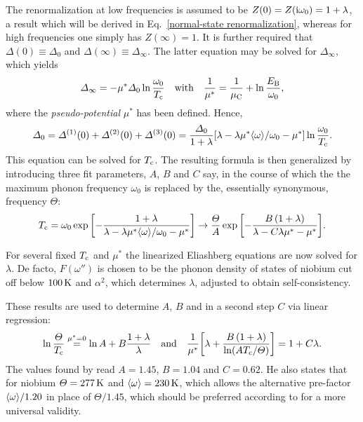 The renormalization at low frequencies is assumed to be $Z(0) = Z(\mathrm i \omega_0) =
1 + \lambda$, a result which will be derived in Eq.~\ref{normal-state
renormalization}, whereas for high frequencies one simply has $Z(\infty) = 1$.
It is further required that $\Delta(0) \equiv \Delta_0$ and $\Delta(\infty)
\equiv \Delta_\infty$. The latter equation may be solved for $\Delta_\infty$,
which yields
%
\begin{equation} \label{McMillan's Coulomb pseudo-potential}
    \varDelta_\infty = -\mu^* \varDelta_0 \ln \frac{\omega_0}{T \sb{\text{c}}}
    \quad \text{with} \quad
    \frac 1 {\mu^*} = \frac 1 {\mu \sb{\text{C}}} + \ln \frac{E \sb{\text{B}}}{\omega_0},
\end{equation}
%
where the \emph{ pseudo-potential} $\mu^*$ has been defined.
Hence,
%
\begin{equation*}
    \varDelta_0 = \varDelta^{(1)}(0) + \varDelta^{(2)}(0) + \varDelta^{(3)}(0)
    = \frac{\varDelta_0}{1 + \lambda}
    [\lambda - \lambda \mu^* \langle\omega\rangle / \omega_0 - \mu^*]
    \ln \frac{\omega_0}{T \sb{\text{c}}}.
\end{equation*}
%
This equation can be solved for $T \sb{\text{c}}$. The resulting formula is then
generalized by introducing three fit parameters, $A$, $B$ and $C$ say, in the
course of which the the maximum phonon frequency $\omega_0$ is replaced by the,
essentially synonymous,  frequency $\Theta$:
%
\begin{equation*}
    T \sb{\text{c}} = \omega_0 \exp \bigg[ {-\frac
        {1 + \lambda}
        {\lambda - \lambda \mu^* \langle\omega\rangle / \omega_0 - \mu^*}}
    \bigg]
    \rightarrow \frac {\varTheta} A \exp \bigg[ {-\frac
        {B \, (1 + \lambda)}
        {\lambda - C \lambda \mu^* - \mu^*}}
    \bigg].
\end{equation*}

For several fixed $T \sb{\text{c}}$ and $\mu^*$ the linearized Eliashberg equations are
now solved for $\lambda$. De facto, $F(\omega'')$ is chosen to be the phonon
density of states of niobium \cite{NakagawaWoods63} cut off below $100 \, \mathrm
K$ and $\alpha^2$, which determines $\lambda$, adjusted to obtain
self-consistency.

These results are used to determine $A$, $B$ and in a second step $C$ via linear
regression:
%
\begin{equation} \label{linear regression formulas}
    \ln \frac {\varTheta} {T \sb{\text{c}}} \overset{\mu^* = 0}
    = \ln A + B \frac{1 + \lambda}{\lambda}
    \quad \text{and} \quad
    \frac 1 {\mu^*} \bigg[
        \lambda + \frac{B \, (1 + \lambda)}{\ln (A T \sb{\text{c}} / \varTheta)}
    \bigg] = 1 + C \lambda.
\end{equation}
%
The values found by  read $A = 1.45$, $B = 1.04$ and $C = 0.62$.
He also states that for niobium $\varTheta = 277 \, \mathrm K$ and $\langle\omega\rangle = 230
\, \mathrm K$, which allows the alternative pre-factor $\langle\omega\rangle / 1.20$ in
place of $\Theta / 1.45$, which should be preferred according to 
\cite{Dynes72} for a more universal validity.


